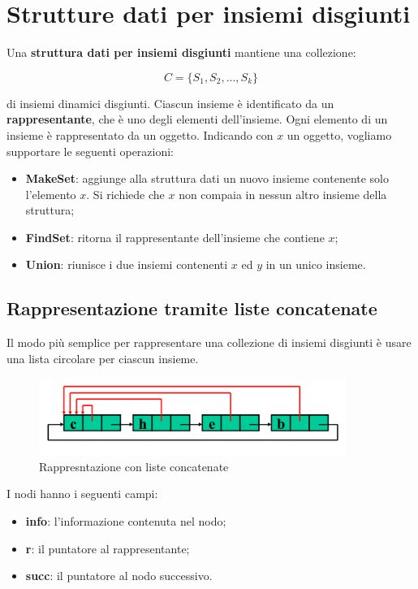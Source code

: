 \section{Strutture dati per insiemi disgiunti}

Una \textbf{struttura dati per insiemi disgiunti} mantiene una collezione:

$$C=\{S_1,S_2,...,S_k\}$$ 

di insiemi dinamici disgiunti. Ciascun insieme è identificato da un \textbf{rappresentante}, che è uno degli elementi dell'insieme. Ogni elemento di un insieme è rappresentato da un oggetto. Indicando con $x$ un oggetto, vogliamo supportare le seguenti operazioni:

\begin{itemize}

\item \textbf{MakeSet}: aggiunge alla struttura dati un nuovo insieme contenente solo l'elemento $x$. Si richiede che $x$ non compaia in nessun altro insieme della struttura;
\item \textbf{FindSet}: ritorna il rappresentante dell'insieme che contiene $x$;
\item \textbf{Union}: riunisce i due insiemi contenenti $x$ ed $y$ in un unico insieme.

\end{itemize}

\subsection{Rappresentazione tramite liste concatenate}

Il modo più semplice per rappresentare una collezione di insiemi disgiunti è usare una lista circolare per ciascun insieme. 

\begin{figure}[htpd]
\centering
\includegraphics[width=100mm]{images/list-representation.png}
\caption{Rappresntazione con liste concatenate}
\end{figure}

I nodi hanno i seguenti campi:

\begin{itemize}

\item \textbf{info}: l'informazione contenuta nel nodo;
\item \textbf{r}: il puntatore al rappresentante;
\item \textbf{succ}: il puntatore al nodo successivo.

\end{itemize}

